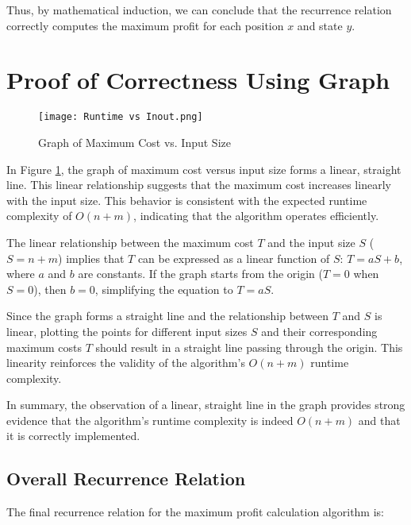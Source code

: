 \documentclass{article}
\begin{document}
Thus, by mathematical induction, we can conclude that the recurrence relation correctly computes the maximum profit for each position \( x \) and state \( y \).


\section{Proof of Correctness Using Graph}

\begin{figure}[h]
    \centering
    \texttt{[image: Runtime vs Inout.png]}
    \caption{Graph of Maximum Cost vs. Input Size}
    \label{fig:graph}
\end{figure}

In Figure \ref{fig:graph}, the graph of maximum cost versus input size forms a linear, straight line. This linear relationship suggests that the maximum cost increases linearly with the input size. This behavior is consistent with the expected runtime complexity of \( O(n + m) \), indicating that the algorithm operates efficiently.

The linear relationship between the maximum cost \( T \) and the input size \( S \) (\( S = n + m \)) implies that \( T \) can be expressed as a linear function of \( S \): \( T = aS + b \), where \( a \) and \( b \) are constants. If the graph starts from the origin (\( T = 0 \) when \( S = 0 \)), then \( b = 0 \), simplifying the equation to \( T = aS \).

Since the graph forms a straight line and the relationship between \( T \) and \( S \) is linear, plotting the points for different input sizes \( S \) and their corresponding maximum costs \( T \) should result in a straight line passing through the origin. This linearity reinforces the validity of the algorithm's \( O(n + m) \) runtime complexity.

In summary, the observation of a linear, straight line in the graph provides strong evidence that the algorithm's runtime complexity is indeed \( O(n + m) \) and that it is correctly implemented.



\subsection{Overall Recurrence Relation}

The final recurrence relation for the maximum profit calculation algorithm is:
\end{document}
